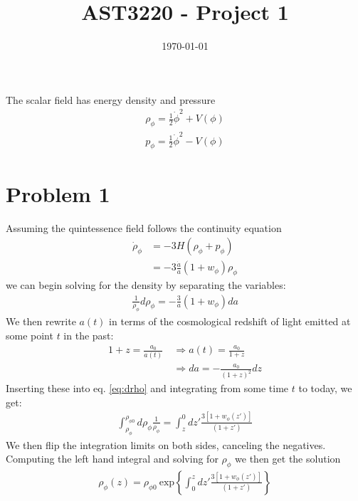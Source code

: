 \documentclass[reprint,english,notitlepage,nofootinbib]{revtex4-1}  %
\numberwithin{equation}{section}
\begin{document}
\title{AST3220 - Project 1}   %
\date{\today}                             %
\noaffiliation                            %
\begin{abstract}                          %
\end{abstract}                            %
\maketitle                                %

The scalar field has energy density and pressure
\begin{align}
	\rho_{\phi} = \frac{1}{2} \dot{\phi}^2 + V(\phi) \label{eq:density} \\
	   p_{\phi} = \frac{1}{2} \dot{\phi}^2 - V(\phi) \label{eq:pressure}
\end{align}
\section{Problem 1}
Assuming the quintessence field follows the continuity equation
\begin{align}
	\dot{\rho}_{\phi} &= -3H\left(\rho_{\phi} + p_{\phi}\right) \\
										&= -3\frac{\dot{a}}{a}\left(1 + w_{\phi}\right)\rho_{\phi}
\end{align}
we can begin solving for the density by separating the variables:
\begin{align}\label{eq:drho}
	\frac{1}{\rho_{\phi}} d\rho_{\phi} = -\frac{3}{a}\left(1+w_{\phi}\right)da
\end{align}
We then rewrite $a(t)$ in terms of the cosmological redshift of light emitted at some point $t$ in the past:
\begin{align}
	1+z = \frac{a_0}{a(t)} \ &\Rightarrow a(t) = \frac{a_0}{1+z} \\
													 &\Rightarrow da  = -\frac{a_0}{(1+z)^2}dz
\end{align}
Inserting these into eq. \ref{eq:drho} and integrating from some time $t$ to
today, we get:
\begin{align}
	\int^{\rho_{\phi0}}_{\rho_{\phi}} d\rho_{\phi} \frac{1}{\rho_{\phi}}
	= \int^{0}_z dz' \frac{3[1+w_\phi (z')]}{(1+z')}
\end{align}
We then flip the integration limits on both sides, canceling the negatives.
Computing the left hand integral and solving for $\rho_\phi$ we then get the solution
\begin{align}
	\rho_\phi(z) = \rho_{\phi 0} \
	\mathrm{exp}\left\{ \int^{z}_0 dz' \frac{3[1+w_\phi (z')]}{(1+z')}\right\}
\end{align}
\end{document}
